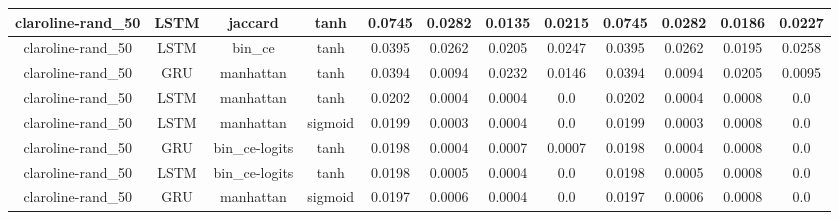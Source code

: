 \documentclass{article}%
\begin{document}
\begin{tabular}{|c|c|c|c|c|c|c|c|c|c|c|c|}
\hline%
claroline{-}rand\_50&LSTM&jaccard&tanh&0.0745&0.0282&0.0135&0.0215&0.0745&0.0282&0.0186&0.0227\\%
\hline%
claroline{-}rand\_50&LSTM&bin\_ce&tanh&0.0395&0.0262&0.0205&0.0247&0.0395&0.0262&0.0195&0.0258\\%
\hline%
claroline{-}rand\_50&GRU&manhattan&tanh&0.0394&0.0094&0.0232&0.0146&0.0394&0.0094&0.0205&0.0095\\%
\hline%
claroline{-}rand\_50&LSTM&manhattan&tanh&0.0202&0.0004&0.0004&0.0&0.0202&0.0004&0.0008&0.0\\%
\hline%
claroline{-}rand\_50&LSTM&manhattan&sigmoid&0.0199&0.0003&0.0004&0.0&0.0199&0.0003&0.0008&0.0\\%
\hline%
claroline{-}rand\_50&GRU&bin\_ce{-}logits&tanh&0.0198&0.0004&0.0007&0.0007&0.0198&0.0004&0.0008&0.0\\%
\hline%
claroline{-}rand\_50&LSTM&bin\_ce{-}logits&tanh&0.0198&0.0005&0.0004&0.0&0.0198&0.0005&0.0008&0.0\\%
\hline%
claroline{-}rand\_50&GRU&manhattan&sigmoid&0.0197&0.0006&0.0004&0.0&0.0197&0.0006&0.0008&0.0\\%
\hline%
\end{tabular}

%
\newpage%
\end{document}
